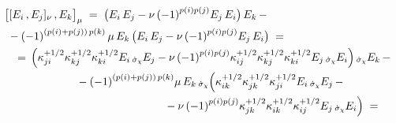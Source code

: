 \documentclass[12pt,reqno,twoside,a4paper]{amsart}
\numberwithin{equation}{section}
\theoremstyle{definition}
\newtheorem{free text}[lema]{}
\theoremstyle{remark}
\newcommand{\sigmachi}{{\raise-1pt\hbox{$ \, \scriptstyle \dot\sigma_\chi $}}}
\theoremstyle{plain}
\begin{document}
\begin{equation}  \label{eq: change-cocycle-bracket-ord_3}
  \begin{aligned}
     &  {\big[[E_i\,,E_j]_\nu \, , E_k\big]}_\mu  \; = \;
%
%
 \big( E_i \, E_j - \nu \, {(-1)}^{p(i)p(j)} E_j \, E_i \big) \, E_k \, -  \\
     &  \;  - {(-1)}^{(p(i)+p(j)) \, p(k)} \, \mu \, E_k \, \big( E_i \, E_j - \nu \, {(-1)}^{p(i)p(j)} E_j \, E_i \big)  \; =  \\
     &  \hskip9pt   = \,  \Big( \kappa_{ji}^{+1/2} \kappa_{kj}^{+1/2} \kappa_{ki}^{+1/2} E_i \sigmachi E_j -
 \nu \, {(-1)}^{p(i)p(j)} \kappa_{ij}^{+1/2} \kappa_{kj}^{+1/2} \kappa_{ki}^{+1/2}E_j \sigmachi E_i \Big) \sigmachi E_k \, -  \\
     &  \hskip65pt   - {(-1)}^{(p(i)+p(j)) \, p(k)} \mu \, E_k \sigmachi \Big( \kappa_{ik}^{+1/2} \kappa_{jk}^{+1/2} \kappa_{ji}^{+1/2} E_i \sigmachi E_j \, -  \\
     &  \hskip145pt   - \nu \, {(-1)}^{p(i)p(j)} \kappa_{jk}^{+1/2} \kappa_{ik}^{+1/2} \kappa_{ij}^{+1/2}E_j \sigmachi E_i \Big)  \; =  \\

\end{aligned}
\end{equation}
\end{document}
